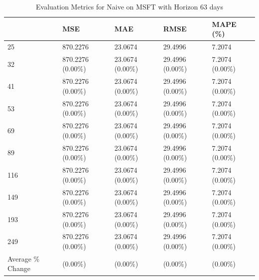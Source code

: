 \begin{table}
\caption{Evaluation Metrics for Naive on MSFT with Horizon 63 days}
\label{tab:naive_MSFT_h63_metrics}
\begin{tabular}{lllll}
\toprule
 & MSE & MAE & RMSE & MAPE (\%) \\
\midrule
25 & 870.2276 & 23.0674 & 29.4996 & 7.2074 \\
32 & 870.2276 (0.00\%) & 23.0674 (0.00\%) & 29.4996 (0.00\%) & 7.2074 (0.00\%) \\
41 & 870.2276 (0.00\%) & 23.0674 (0.00\%) & 29.4996 (0.00\%) & 7.2074 (0.00\%) \\
53 & 870.2276 (0.00\%) & 23.0674 (0.00\%) & 29.4996 (0.00\%) & 7.2074 (0.00\%) \\
69 & 870.2276 (0.00\%) & 23.0674 (0.00\%) & 29.4996 (0.00\%) & 7.2074 (0.00\%) \\
89 & 870.2276 (0.00\%) & 23.0674 (0.00\%) & 29.4996 (0.00\%) & 7.2074 (0.00\%) \\
116 & 870.2276 (0.00\%) & 23.0674 (0.00\%) & 29.4996 (0.00\%) & 7.2074 (0.00\%) \\
149 & 870.2276 (0.00\%) & 23.0674 (0.00\%) & 29.4996 (0.00\%) & 7.2074 (0.00\%) \\
193 & 870.2276 (0.00\%) & 23.0674 (0.00\%) & 29.4996 (0.00\%) & 7.2074 (0.00\%) \\
249 & 870.2276 (0.00\%) & 23.0674 (0.00\%) & 29.4996 (0.00\%) & 7.2074 (0.00\%) \\
Average \% Change & (0.00\%) & (0.00\%) & (0.00\%) & (0.00\%) \\
\bottomrule
\end{tabular}
\end{table}
